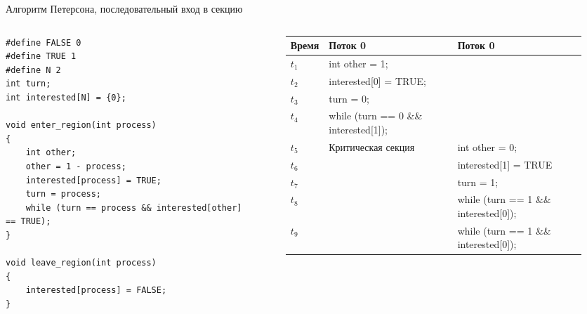\documentclass[aspectratio=169,14pt]{beamer}
\begin{document}
\begin{frame}[containsverbatim]{Алгоритм Петерсона, последовательный вход в секцию}
    \begin{columns}
        \begin{column}{0.32\textwidth}
            \begin{tiny}
                \begin{verbatim}
#define FALSE 0
#define TRUE 1
#define N 2
int turn;
int interested[N] = {0};

void enter_region(int process)
{
    int other;
    other = 1 - process;
    interested[process] = TRUE;
    turn = process;
    while (turn == process && interested[other] == TRUE);
}

void leave_region(int process)
{
    interested[process] = FALSE;
}
                \end{verbatim}
            \end{tiny}
        \end{column}
        \begin{column}{0.68\textwidth}
            \begin{figure}[htp]
                \centering
                \begin{tiny}
                    \begin{tabular}{p{0.5cm}|p{2.4cm}|p{2.4cm}}
                        \hline
                        \textbf{Время} & \textbf{Поток 0} & \textbf{Поток 0} \\ \hline
                        $t_{1}$ & int other = 1; & \\ \hline
                        $t_{2}$ & interested[0] = TRUE; & \\ \hline
                        $t_{3}$ & turn = 0; &   \\ \hline
                        $t_{4}$ & while (turn == 0 \&\& interested[1]); & \\ \hline
                        $t_{5}$ & \multirow{5}{=}{Критическая секция} & int other = 0; \\ \cline{1-1}\cline{3-3}
                        $t_{6}$ & & interested[1] = TRUE \\ \cline{1-1}\cline{3-3}
                        $t_{7}$ & & turn = 1; \\ \cline{1-1}\cline{3-3}
                        $t_{8}$ & & while (turn == 1 \&\& interested[0]); \\ \cline{1-1}\cline{3-3}
                        $t_{9}$ & & while (turn == 1 \&\& interested[0]); \\ \hline

\end{tabular}
\end{tiny}
\end{figure}
\end{column}
\end{columns}
\end{frame}
\end{document}

